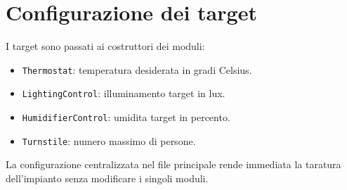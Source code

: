 \section{Configurazione dei target}
I target sono passati ai costruttori dei moduli:
\begin{itemize}
  \item \texttt{Thermostat}: temperatura desiderata in gradi Celsius.
  \item \texttt{LightingControl}: illuminamento target in lux.
  \item \texttt{HumidifierControl}: umidita target in percento.
  \item \texttt{Turnstile}: numero massimo di persone.
\end{itemize}
La configurazione centralizzata nel file principale rende immediata la taratura dell'impianto senza modificare i singoli moduli.
